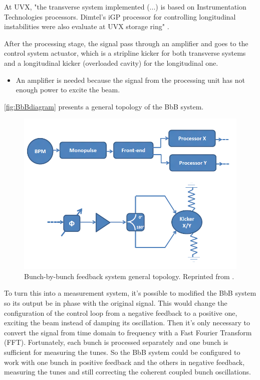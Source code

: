 At UVX, "the transverse system implemented (...) is based on Instrumentation Technologies processors. Dimtel's iGP processor for controlling longitudinal instabilities were also evaluate at UVX storage ring" \cite{digFeedback}.

After the processing stage, the signal pass through an amplifier and goes to the control system actuator, which is a stripline kicker for both transverse systems and a longitudinal kicker (overloaded cavity) for the longitudinal one.

\begin{itemize}
	\item An amplifier is needed because the signal from the processing unit has not enough power to excite the beam.
\end{itemize}

\autoref{fig:BbBdiagram} presents a general topology of the BbB system.

\begin{figure}[!htb]
	\centering
	\includegraphics[width=0.8\linewidth]{./Figures/BbBdiagram.png}
	\caption{Bunch-by-bunch feedback system general topology. Reprinted from \cite{digFeedback}.}
	\label{fig:BbBdiagram}
\end{figure}

To turn this into a measurement system, it's possible to modified the BbB system so its output be in phase with the original signal. This would change the configuration of the control loop from a negative feedback to a positive one, exciting the beam instead of damping its oscillation. Then it's only necessary to convert the signal from time domain to frequency with a Fast Fourier Transform (FFT). Fortunately, each bunch is processed separately and one bunch is sufficient for measuring the tunes. So the BbB system could be configured to work with one bunch in positive feedback and the others in negative feedback, measuring the tunes and still correcting the coherent coupled bunch oscillations.


